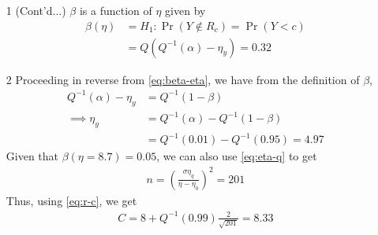 \documentclass{beamer}
\providecommand{\pr}[1]{\ensuremath{\Pr\left(#1\right)}}
\begin{document}
\begin{frame}
	\begin{enumerate}
		\item[1] (Cont'd...) $\beta$ is a function of $\eta$ given by
			\begin{align}
				\beta(\eta) &= H_1:\pr{Y \notin R_c} = \pr{Y < c} \\
				&= Q(Q^{-1}(\alpha) - \eta_y) = 0.32
				\label{eq:beta-eta}
			\end{align}
		\item[2] Proceeding in reverse from \eqref{eq:beta-eta}, we have from the definition of $\beta$, 
			\begin{align}
				Q^{-1}(\alpha) - \eta_y &= Q^{-1}(1 - \beta) \\
				\implies \eta_y &= Q^{-1}(\alpha) - Q^{-1}(1 - \beta) \\
				&= Q^{-1}(0.01) - Q^{-1}(0.95) = 4.97
				\label{eq:eta-q-rev}
			\end{align}
			Given that $\beta(\eta = 8.7) = 0.05$, we can also use \eqref{eq:eta-q} to get 
			\begin{align}
				n = \left(\frac{\sigma\eta_q}{\eta - \eta_0}\right)^2 = 201
				\label{eq:n}
			\end{align}
			Thus, using \eqref{eq:r-c}, we get 
			\begin{align}
				C = 8 + Q^{-1}(0.99)\frac{2}{\sqrt{201}} = 8.33
				\label{eq:c-ans}
			\end{align}
	\end{enumerate}
\end{frame}
\end{document}
